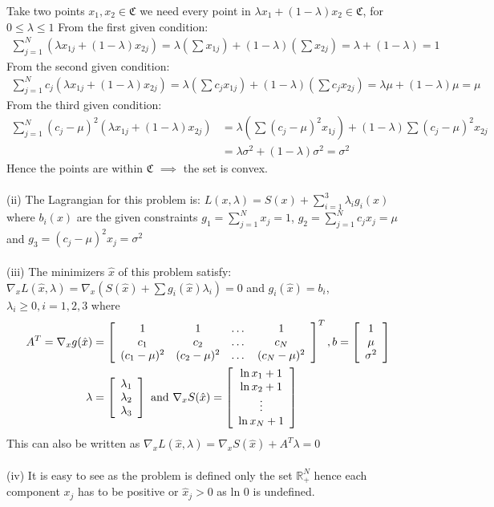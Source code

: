 \documentclass[12pt]{report}
\begin{document}
Take two points $x_1,x_2 \in \mathfrak{C}$ we need every point in $\lambda x_1 + (1-\lambda) x_2 \in \mathfrak{C}$, for 
$0\leq \lambda \leq 1 $
From the first given condition:
\begin{align*}
\sum_{j=1}^{N} \left( \lambda x_{1j} + (1- \lambda) x_{2j} \right) 
= \lambda(\sum x_{1j})+(1-\lambda)(\sum x_{2j}) = \lambda + (1-\lambda) = 1
\end{align*}
From the second given condition:
\begin{align*}
\sum_{j=1}^{N} c_j\left( \lambda x_{1j} + (1- \lambda) x_{2j} \right)
= \lambda(\sum c_j x_{1j} )+(1-\lambda)(\sum c_j x_{2j}) =  \lambda \mu + (1- \lambda) \mu = \mu
\end{align*}
From the third given condition:
\begin{align*}
\sum_{j=1}^{N} ( c_j-\mu )^2 ( \lambda x_{1j} + (1- \lambda) x_{2j} )
&=  \lambda \left( \sum( c_j-\mu )^2 x_{1j} \right) +(1- \lambda) \sum( c_j-\mu )^2x_{2j}\\
&= \lambda \sigma^2 + (1- \lambda) \sigma^2 = \sigma^2
\end{align*}
Hence the points are within $\mathfrak{C}$ $\implies$ the set is convex.\\
\\
(ii) The Lagrangian for this problem is: $L(x,\lambda)= S(x) + \sum_{i=1}^3 \lambda_i g_i(x) $ where $b_i(x)$ are the given
constraints $g_1 = \sum_{j=1}^Nx_j=1$, $g_2 = \sum_{j=1}^Nc_jx_j=\mu$ and $g_3 = (c_j-\mu)^2x_j=\sigma^2$\\
\\
(iii) The minimizers $\hat{x}$ of this problem satisfy:\\
$\nabla_x L(\hat{x},\lambda)=\nabla_x(S(\hat{x})+\sum g_i(\hat{x})\lambda_i)=0 $ and $g_i(\hat{x})=b_i$,
$\lambda_i\geq 0, i=1,2,3$ where 
\begin{align*}
A^T = \nabla_x g(\hat{x}) &= \left[\begin{array}{c c c c}
1 & 1 & \dots &1 \\
c_1 & c_2 & \dots & c_N \\
(c_1-\mu)^2 & (c_2-\mu)^2 & \dots & (c_N-\mu)^2
\end{array}\right]^T,
b= \left[ \begin{array}{c}
1 \\
\mu \\
\sigma^2
\end{array} \right] \\
\lambda &= \left[
\begin{array}{c}
\lambda_1 \\ \lambda_2 \\ \lambda_3 
\end{array}
\right] \text{ and }
\nabla_x S(\hat{x}) = \left[ \begin{array}{c}
\ln x_1 + 1 \\
\ln x_2 + 1 \\
\vdots \\
\ln x_N + 1 \\
\end{array} \right] 
\end{align*}
This can also be written as $\nabla_x L(\hat{x},\lambda) = \nabla_xS(\hat{x})+A^T\lambda=0 $\\
\\
(iv) It is easy to see as the problem is defined only the set $\mathbb{R}^N_+$ hence each component $x_j$ has to be positive
or $\hat{x}_j>0$ as ln 0 is undefined.
\end{document}
